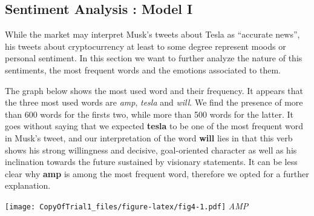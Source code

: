\documentclass[
]{article}
\begin{document}
\hypertarget{sentiment-analysis-model-i}{%
\subsection{Sentiment Analysis : Model
I}\label{sentiment-analysis-model-i}}

While the market may interpret Musk's tweets about Tesla as ``accurate
news'', his tweets about cryptocurrency at least to some degree
represent moods or personal sentiment. In this section we want to
further analyze the nature of this sentiments, the most frequent words
and the emotions associated to them.

The graph below shows the most used word and their frequency. It appears
that the three most used words are \emph{amp}, \emph{tesla} and
\emph{will}. We find the presence of more than 600 words for the firsts
two, while more than 500 words for the latter. It goes without saying
that we expected \textbf{tesla} to be one of the most frequent word in
Musk's tweet, and our interpretation of the word \textbf{will} lies in
that this verb shows his strong willingness and decisive, goal-oriented
character as well as his inclination towards the future sustained by
visionary statements. It can be less clear why \textbf{amp} is among the
most frequent word, therefore we opted for a further explanation.

\texttt{[image: CopyOfTrial1\_files/figure-latex/fig4-1.pdf]} \emph{AMP}
\end{document}
